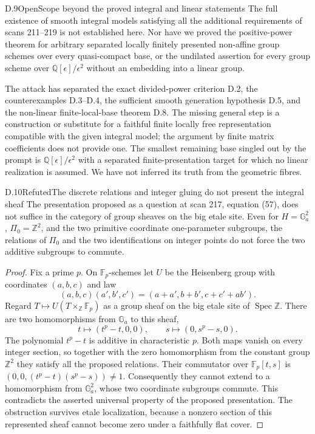 \begin{statement}{D.9}{Open}{Scope beyond the proved integral and linear statements}
The full existence of smooth integral models satisfying all the
additional requirements of scans 211--219 is not established here.
Nor have we proved the positive-power theorem for arbitrary separated
locally finitely presented non-affine group schemes over every
quasi-compact base, or the undilated assertion for every group
scheme over $\mathbb Q[\epsilon]/\epsilon^2$ without an embedding
into a linear group.
\end{statement}
\noindent
The attack has separated the exact divided-power criterion D.2,
the counterexamples D.3--D.4, the sufficient smooth generation
hypothesis D.5, and the non-linear finite-local-base theorem D.8.
The missing general step is a construction or substitute for a
faithful finite locally free representation compatible with the
given integral model; the argument by finite matrix coefficients
does not provide one.  The smallest remaining base singled out
by the prompt is $\mathbb Q[\epsilon]/\epsilon^2$ with a separated
finite-presentation target for which no linear realization is
assumed.  We have not inferred its truth from the geometric fibres.

\begin{statement}{D.10}{Refuted}{The discrete relations and integer gluing do not present the integral sheaf}
The presentation proposed as a question at scan 217, equation (57),
does not suffice in the category of group sheaves on the big etale
site.  Even for $H=\mathbb G_a^2$, $\Pi_0=\mathbb Z^2$, and the
two primitive coordinate one-parameter subgroups, the relations
of $\Pi_0$ and the two identifications on integer points do not
force the two additive subgroups to commute.
\end{statement}
\begin{proof}
Fix a prime $p$.  On $\mathbb F_p$-schemes let $U$ be the Heisenberg
group with coordinates $(a,b,c)$ and law
\[
 (a,b,c)(a',b',c')=(a+a',b+b',c+c'+ab').
\]
Regard $T\mapsto U(T\times_{\mathbb Z}\mathbb F_p)$ as a group
sheaf on the big etale site of $\operatorname{Spec}\mathbb Z$.
There are two homomorphisms from $\mathbb G_a$ to this sheaf,
\[
 t\longmapsto(t^p-t,0,0),\qquad
 s\longmapsto(0,s^p-s,0).
\]
The polynomial $t^p-t$ is additive in characteristic $p$.  Both
maps vanish on every integer section, so together with the zero
homomorphism from the constant group $\mathbb Z^2$ they satisfy
all the proposed relations.  Their commutator over
$\mathbb F_p[t,s]$ is $(0,0,(t^p-t)(s^p-s))\ne1$.
Consequently they cannot extend to a homomorphism from
$\mathbb G_a^2$, whose two coordinate subgroups commute.  This
contradicts the asserted universal property of the proposed
presentation.  The obstruction survives etale localization,
because a nonzero section of this represented sheaf cannot
become zero under a faithfully flat cover.
\end{proof}

